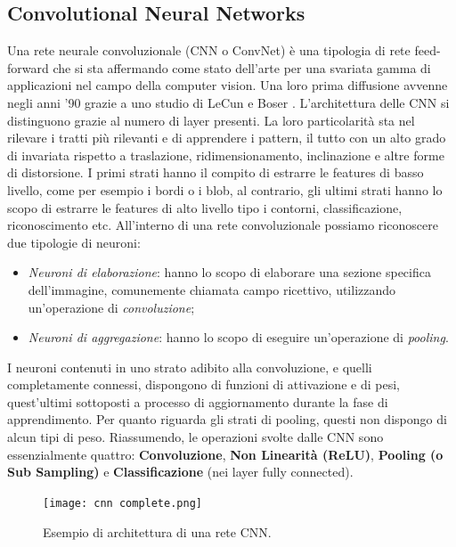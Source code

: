 \subsection{Convolutional Neural Networks}\label{RNC}
Una rete neurale convoluzionale (CNN o ConvNet) è una tipologia di rete feed-
forward che si sta affermando come stato dell'arte per una svariata gamma di 
applicazioni nel campo della computer vision. Una loro prima diffusione avvenne 
negli anni '90 grazie a uno studio di LeCun e Boser \cite{NIPS1989_53c3bce6}. L'architettura delle CNN 
si distinguono grazie al numero di layer presenti.  La loro particolarità sta nel 
rilevare i tratti più rilevanti e di apprendere i pattern, il tutto con un alto grado di 
invariata rispetto a traslazione, ridimensionamento, inclinazione e altre forme di 
distorsione. I primi strati hanno il compito di estrarre le features di basso livello, 
come per esempio i bordi o i blob, al contrario, gli ultimi strati hanno lo scopo di 
estrarre le features di alto livello tipo i contorni, classificazione, riconoscimento 
etc. All'interno di una rete convoluzionale possiamo riconoscere due tipologie di 
neuroni:
\begin{itemize}
    \item \emph{Neuroni di elaborazione}: hanno lo scopo di elaborare una sezione specifica 
    dell'immagine, comunemente chiamata campo ricettivo, utilizzando 
    un'operazione di \emph{convoluzione};
    \item \emph{Neuroni di aggregazione}: hanno lo scopo di eseguire un'operazione di \emph{pooling}.
\end{itemize}
I neuroni contenuti in uno strato adibito alla convoluzione, e quelli completamente 
connessi, dispongono di funzioni di attivazione e di pesi, quest'ultimi sottoposti a 
processo di aggiornamento durante la fase di apprendimento. Per quanto riguarda 
gli strati di pooling, questi non dispongo di alcun tipi di peso. Riassumendo, 
le operazioni svolte dalle CNN sono essenzialmente quattro: {\bfseries{Convoluzione}}, {\bfseries{Non 
Linearità (ReLU)}}, {\bfseries{Pooling (o Sub Sampling)}} e {\bfseries{Classificazione}} (nei layer 
fully connected). 
\begin{figure}
    \centering
    \texttt{[image: cnn complete.png]}
    \centering
    \caption{Esempio di architettura di una rete CNN.}
    \label{CNN complete}
\end{figure}

